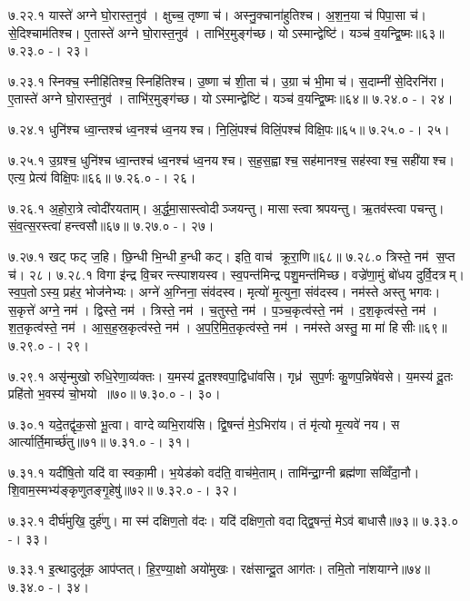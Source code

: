 ७.२२.१
यास्ते॑ अग्ने घो॒रास्त॒नुव॑। क्षुच्च॒ तृष्णा च॑। अस्नु॒क्चाना॑हुतिश्च। अ॒श॒न॒या च॑ पिपा॒सा च॑। से॒दिश्चाम॑तिश्च। ए॒तास्ते॑ अग्ने घो॒रास्त॒नुव॑। ताभि॑र॒मुङ्ग॑च्छ। योऽस्मान्द्वेष्टि॑। यञ्च॑ व॒यन्द्वि॒ष्मः॥६३॥
७.२३.०
-। २३।
\anuvakamend

७.२३.१
स्निक्च॒ स्नीहि॑तिश्च॒ स्निहि॑तिश्च। उ॒ष्णा च॑ शी॒ता च॑। उ॒ग्रा च॑ भी॒मा च॑। स॒दाम्नी॑ से॒दिरनि॑रा। ए॒तास्ते॑ अग्ने घो॒रास्त॒नुव॑। ताभि॑र॒मुङ्ग॑च्छ। योऽस्मान्द्वेष्टि॑। यञ्च॑ व॒यन्द्वि॒ष्मः॥६४॥
७.२४.०
-। २४।
\anuvakamend

७.२४.१
धुनि॑श्च ध्वा॒न्तश्च॑ ध्व॒नश्च॑ ध्व॒नयश्च। नि॒लिं॒पश्च॑ विलिं॒पश्च॑ विक्षि॒पः॥६५॥
७.२५.०
-। २५।
\anuvakamend

७.२५.१
उ॒ग्रश्च॒ धुनि॑श्च ध्वा॒न्तश्च॑ ध्व॒नश्च॑ ध्व॒नयश्च। स॒ह॒स॒ह्वाश्च॒ सह॑मानश्च॒ सह॑स्वाश्च॒ सही॑याश्च। एत्य॒ प्रेत्य॑ विक्षि॒पः॥६६॥
७.२६.०
-। २६।
\anuvakamend

७.२६.१
अ॒हो॒रा॒त्रे त्वोदी॑रयताम्। अ॒र्द्ध॒मा॒सास्त्वोदीञ्जयन्तु। मासास्त्वा श्रपयन्तु। ऋ॒तव॑स्त्वा पचन्तु। सं॒व॒त्स॒रस्त्वा॑ हन्त्वसौ॥६७॥
७.२७.०
-। २७।
\anuvakamend

७.२७.१
खट् फट् ज॒हि। छि॒न्धी भि॒न्धी ह॒न्धी कट्। इति॒ वाच॑ क्रूरा॒णि॥६८॥
७.२८.०
त्रिस्ते॒ नम॑ स॒प्त च॑। २८।
७.२८.१
विगा इ॑न्द्र वि॒चरन्त्स्पाशयस्व। स्व॒पन्त॑मिन्द्र पशु॒मन्त॑मिच्छ। वज्रे॑णा॒मुं बो॑धय दुर्वि॒दत्रम्। स्व॒प॒तोऽस्य॒ प्रह॑र॒ भोज॑नेभ्यः। अग्ने॑ अ॒ग्निना॒ संव॑दस्व। मृत्यो॑ मृ॒त्युना॒ संव॑दस्व। नम॑स्ते अस्तु भगवः। स॒कृत्ते॑ अग्ने॒ नम॑। द्विस्ते॒ नम॑। त्रिस्ते॒ नम॑। च॒तुस्ते॒ नम॑। प॒ञ्च॒कृत्व॑स्ते॒ नम॑। द॒श॒कृत्व॑स्ते॒ नम॑। श॒त॒कृत्व॑स्ते॒ नम॑। आ॒स॒ह॒स्र॒कृत्व॑स्ते॒ नम॑। अ॒प॒रि॒मि॒त॒कृत्व॑स्ते॒ नम॑। नम॑स्ते अस्तु॒ मा मा॑ हिसीः॥६९॥
७.२९.०
-। २९।
\anuvakamend

७.२९.१
असृ॑न्मुखो रुधि॒रेणा॒व्य॑क्तः। य॒मस्य॑ दू॒तश्श्वपा॒द्विधा॑वसि। गृध्र॑ सुप॒र्णः कु॒णप॒न्निषे॑वसे। य॒मस्य॑ दू॒तः प्रहि॑तो भ॒वस्य॑ चो॒भयो॥७०॥
७.३०.०
-। ३०।
\anuvakamend

७.३०.१
यदे॒तद्वृ॑क॒सो भू॒त्वा। वाग्देव्यभि॒राय॑सि। द्वि॒षन्तं॑ मे॒ऽभिरा॑य। तं मृ॑त्यो मृ॒त्यवे॑ नय। स आर्त्यार्ति॒मार्च्छ॑तु॥७१॥
७.३१.०
-। ३१।
\anuvakamend

७.३१.१
यदी॑षि॒तो यदि॑ वा स्वका॒मी। भ॒येड॑को वद॑ति॒ वाच॑मे॒ताम्। तामि॑न्द्रा॒ग्नी ब्रह्म॑णा सव्विँदा॒नौ। शि॒वाम॒स्मभ्य॑ङ्कृणुतङ्गृ॒हेषु॑॥७२॥
७.३२.०
-। ३२।
\anuvakamend

७.३२.१
दीर्घ॑मुखि॒ दुर्\mbox{}ह॑णु। मा स्म॑ दक्षिण॒तो व॑दः। यदि॑ दक्षिण॒तो वदाद्द्वि॒षन्तं॒ मेऽव॑ बाधासै॥७३॥
७.३३.०
-। ३३।
\anuvakamend

७.३३.१
इ॒त्थादुलू॑क॒ आप॑प्तत्। हि॒र॒ण्या॒क्षो अयो॑मुखः। रक्ष॑सान्दू॒त आग॑तः। तमि॒तो ना॑शयाग्ने॥७४॥
७.३४.०
-। ३४।
\anuvakamend

